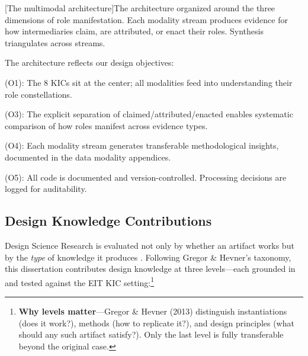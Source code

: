 \documentclass[../main.tex]{subfiles}
\begin{document}
\begin{center}
[The \RoleBox multimodal architecture]{The \RoleBox architecture organized around the three dimensions of role manifestation. Each modality stream produces evidence for how intermediaries claim, are attributed, or enact their roles. Synthesis triangulates across streams.}
\label{fig:toolkit-architecture}
\end{center}

The architecture reflects our design objectives:

\begin{description}[leftmargin=0.5cm, itemsep=0.2em]
\item[Intermediary focus] (O1): The 8 KICs sit at the center; all modalities feed into understanding their role constellations.
\item[Triangulation] (O3): The explicit separation of claimed/attributed/enacted enables systematic comparison of how roles manifest across evidence types.
\item[Design knowledge] (O4): Each modality stream generates transferable methodological insights, documented in the data modality appendices.
\item[Transparency] (O5): All code is documented and version-controlled. Processing decisions are logged for auditability.
\end{description}

\subsection{Design Knowledge Contributions}

Design Science Research is evaluated not only by whether an artifact works but by the \emph{type} of knowledge it produces \parencite{gregor2013positioning}. Following Gregor \& Hevner's taxonomy, this dissertation contributes design knowledge at three levels---each grounded in and tested against the EIT KIC setting:\footnote{\textbf{Why levels matter}---Gregor \& Hevner (2013) distinguish instantiations (does it work?), methods (how to replicate it?), and design principles (what should any such artifact satisfy?). Only the last level is fully transferable beyond the original case.}
\end{document}
